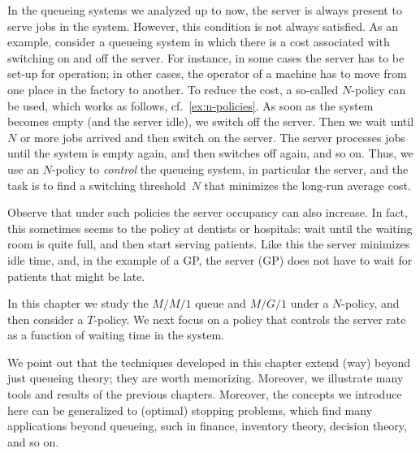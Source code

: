 In the queueing systems we analyzed up to now, the server is always present to serve jobs in the system. However, this condition is not always satisfied.
As an example, consider a queueing system in which there is a cost associated with switching on and off the server.
For instance, in some cases the server has to be set-up for operation; in other cases, the operator of a machine has to move from one place in the factory to another.
To reduce the cost, a so-called $N$-policy can be used, which works as follows, cf.~\cref{ex:n-policies}.
As soon as the system becomes empty (and the server idle), we switch off the server.
Then we wait until $N$ or more jobs arrived and then switch on the server.
The server processes jobs until the system is empty again, and then switches off again, and so on.
Thus, we use an $N$-policy to \emph{control} the queueing system, in particular the server, and the task is to find a switching threshold~$N$ that minimizes the long-run average cost.

Observe that under such policies the server occupancy can also increase.
In fact, this sometimes seems to the policy at dentists or hospitals: wait until the waiting room is quite full, and then start serving patients.
Like this the server minimizes idle time, and, in the example of a GP, the server (GP) does not have to wait for patients that might be late.

In this chapter we study the $M/M/1$ queue and $M/G/1$ under a $N$-policy, and then consider a $T$-policy.
We next focus on a policy that controls the server rate as a function of waiting time in the system.


We point out that the techniques developed in this chapter extend (way) beyond just queueing theory; they are worth memorizing.
Moreover, we illustrate many tools and results of the previous chapters.
Moreover, the concepts we introduce here can be generalized to (optimal) stopping problems, which find many applications beyond queueing, such in finance, inventory theory, decision theory, and so on.









%
%
%
%
%


\backmatter


